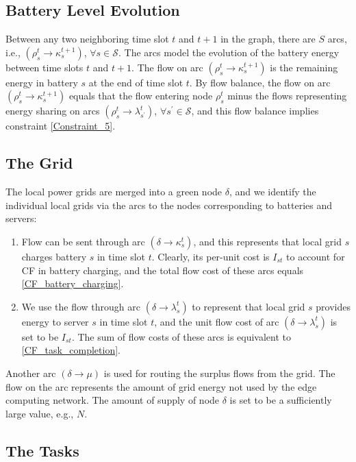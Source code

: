 \documentclass[conference, 10pt, ﬁnal, letterpaper, twocolumn]{IEEEtran}
\begin{document}
\subsection{Battery Level Evolution}
Between any two neighboring time slot $t$ and $t+1$ in the graph, there are $S$ arcs, i.e., $(\rho^{t}_{s}\rightarrow\kappa^{t+1}_{s})$, $\forall s\in \mathcal{S}$. The arcs model the evolution of the battery energy between time slots $t$ and $t+1$. The flow on arc $(\rho^{t}_{s}\rightarrow \kappa^{t+1}_{s})$ is the remaining energy in battery $s$ at the end of time slot $t$. By flow balance, the flow on arc $(\rho^{t}_{s}\rightarrow \kappa^{t+1}_{s})$ equals that the flow entering node $\rho^{t}_{s}$ minus the flows representing energy sharing on arcs $(\rho^{t}_{s}\rightarrow \lambda^{t}_{s^\prime})$, $\forall s^\prime \in \mathcal{S}$, and this flow balance implies constraint \eqref{Constraint_5}.

\subsection{The Grid}

The local power grids are merged into a green node $\delta$, and we identify the individual local grids via the arcs to the nodes corresponding to batteries and servers:
\begin{enumerate}
    \item Flow can be sent through arc $(\delta \rightarrow\kappa^{t}_{s})$, and this represents that local grid $s$ charges battery $s$ in time slot $t$. Clearly, its per-unit cost is $I_{st}$ to account for CF in battery charging, and the total flow cost of these arcs equals \eqref{CF_battery_charging}.
    \item We use the flow through arc $(\delta \rightarrow \lambda^{t}_{s})$ to represent that local grid $s$ provides energy to server $s$ in time slot $t$, and the unit flow cost of arc $(\delta \rightarrow \lambda^{t}_{s})$ is set to be $I_{st}$. The sum of flow costs of these arcs is equivalent to \eqref{CF_task_completion}.
\end{enumerate}
Another arc $(\delta \rightarrow \mu)$ is used for routing the surplus flows from the grid. The flow on the arc represents the amount of grid energy not used by the edge computing network. The amount of supply of node $\delta$ is set to be a sufficiently large value, e.g., $N$. 

\subsection{The Tasks}
\end{document}
